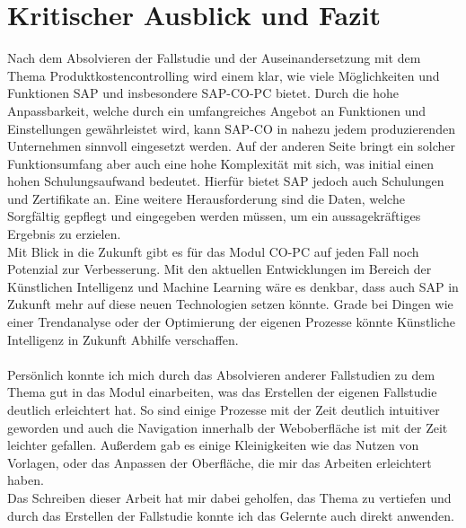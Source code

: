 \newpage
\section{Kritischer Ausblick und Fazit}
Nach dem Absolvieren der Fallstudie und der Auseinandersetzung mit dem Thema Produktkostencontrolling wird einem klar, wie viele Möglichkeiten und Funktionen
SAP und insbesondere SAP-CO-PC bietet. Durch die hohe Anpassbarkeit, welche durch ein umfangreiches Angebot an Funktionen und Einstellungen gewährleistet 
wird, kann SAP-CO in nahezu jedem produzierenden Unternehmen sinnvoll eingesetzt werden. Auf der anderen Seite bringt ein solcher Funktionsumfang aber auch eine hohe Komplexität
mit sich, was initial einen hohen Schulungsaufwand bedeutet. Hierfür bietet SAP jedoch auch Schulungen und Zertifikate an. Eine weitere Herausforderung
sind die Daten, welche Sorgfältig gepflegt und eingegeben werden müssen, um ein aussagekräftiges Ergebnis zu erzielen.\\
Mit Blick in die Zukunft gibt es für das Modul CO-PC auf jeden Fall noch Potenzial zur Verbesserung. Mit den aktuellen Entwicklungen im Bereich der Künstlichen Intelligenz und Machine Learning
wäre es denkbar, dass auch SAP in Zukunft mehr auf diese neuen Technologien setzen könnte. Grade bei Dingen wie einer Trendanalyse oder der Optimierung der eigenen Prozesse könnte Künstliche Intelligenz
in Zukunft Abhilfe verschaffen.
\\
\\
Persönlich konnte ich mich durch das Absolvieren anderer Fallstudien zu dem Thema gut in das Modul einarbeiten, was das Erstellen der eigenen Fallstudie deutlich erleichtert hat. So sind 
einige Prozesse mit der Zeit deutlich intuitiver geworden und auch die Navigation innerhalb der Weboberfläche ist mit der Zeit leichter gefallen. Außerdem gab es einige Kleinigkeiten wie 
das Nutzen von Vorlagen, oder das Anpassen der Oberfläche, die mir das Arbeiten erleichtert haben.\\
Das Schreiben dieser Arbeit hat mir dabei 
geholfen, das Thema zu vertiefen und durch das Erstellen der Fallstudie konnte ich das Gelernte auch direkt anwenden.